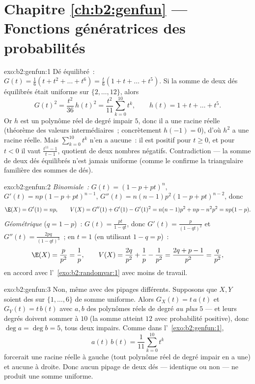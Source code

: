 \section*{Chapitre \ref{ch:b2:genfun} --- Fonctions génératrices des probabilités}

\begin{solution}{exo:b2:genfun:1}
Dé équilibré~: $G(t) = \frac16(t + t^2 + \dots + t^6) = \frac t6(1 + t
+ \dots + t^5)$. Si la somme de deux dés équilibrés était uniforme sur
$\{2, \dots, 12\}$, alors
\[
G(t)^2 = \frac{t^2}{36}\,h(t)^2
= \frac{t^2}{11}\sum_{k=0}^{10}t^k ,
\qquad h(t) = 1 + t + \dots + t^5 .
\]
Or $h$ est un polynôme réel de degré impair $5$, donc il a une racine
réelle (théorème des valeurs intermédiaires~; concrètement $h(-1) =
0$), d'où $h^2$ a une racine réelle. Mais $\sum_{k=0}^{10}t^k$ n'en a
aucune~: il est positif pour $t \geq 0$, et pour $t < 0$ il vaut
$\frac{t^{11} - 1}{t - 1}$, quotient de deux nombres négatifs.
Contradiction --- la somme de deux dés équilibrés n'est jamais uniforme
(comme le confirme la  triangulaire familière des sommes de dés).
\end{solution}

\begin{solution}{exo:b2:genfun:2}
\emph{Binomiale~:} $G(t) = (1 - p + pt)^n$, $G'(t) = np(1 - p +
pt)^{n-1}$, $G''(t) = n(n-1)p^2(1 - p + pt)^{n-2}$, donc
\[
\E(X) = G'(1) = np,
\qquad
V(X) = G''(1) + G'(1) - G'(1)^2
= n(n-1)p^2 + np - n^2p^2 = np(1-p).
\]
\emph{Géométrique} ($q = 1 - p$)~: $G(t) = \frac{pt}{1 - qt}$, donc
$G'(t) = \frac{p}{(1 - qt)^2}$ et $G''(t) = \frac{2pq}{(1 -
qt)^3}$~; en $t = 1$ (en utilisant $1 - q = p$)~:
\[
\E(X) = \frac{p}{p^2} = \frac1p,
\qquad
V(X) = \frac{2q}{p^2} + \frac1p - \frac{1}{p^2}
= \frac{2q + p - 1}{p^2}
= \frac{q}{p^2} ,
\]
en accord avec l'~\cref{exo:b2:randomvar:1} avec moins de travail.
\end{solution}

\begin{solution}{exo:b2:genfun:3}
Non, même avec des pipages différents. Supposons que $X, Y$ soient des
 sur $\{1, \dots, 6\}$ de somme uniforme. Alors $G_X(t) = t\,a(t)$ et
$G_Y(t) = t\,b(t)$ avec $a, b$ des polynômes réels de degré \emph{au
plus} $5$ --- et leurs degrés doivent sommer à $10$ (la somme atteint
$12$ avec probabilité positive), donc $\deg a = \deg b = 5$, tous deux
impairs. Comme dans l'~\cref{exo:b2:genfun:1},
\[
a(t)\,b(t) = \frac{1}{11}\sum_{k=0}^{10}t^k
\]
forcerait une racine réelle à gauche (tout polynôme réel de degré
impair en a une) et aucune à droite. Donc aucun pipage de deux dés
 --- identique ou non --- ne produit une somme uniforme.
\end{solution}


